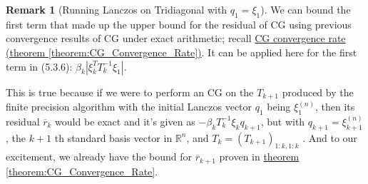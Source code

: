 \documentclass[]{article}
\theoremstyle{definition}
\newtheorem{remark}{Remark}[subsection]  %
\begin{document}
            \begin{remark}[Running Lanczos on Tridiagonal with $q_1=\xi_1$]\label{remark:CG_Float_Remark}
                We can bound the first term that made up the upper bound for the residual of CG using previous convergence results of CG under exact arithmetic; recall \hyperref[theorem:CG_Convergence_Rate]{CG convergence rate (theorem \ref*{theorem:CG_Convergence_Rate})}. It can be applied here for the first term in (5.3.6): 
                $\beta_k |
                \xi_k^T T_k^{-1}\xi_1|$. 
                \par
                This is true because if we were to perform an CG on the $T_{k + 1}$ produced by the finite precision algorithm with the initial Lanczos vector $q_1$ being $\xi_1^{(n)}$, then its residual $\overline{r}_{k}$ would be exact and it's given as $-\beta_kT_{k}^{-1}\xi_kq_{k + 1}$, but with $q_{k + 1} = \xi_{k + 1}^{(n)}$, the $k + 1$ th standard basis vector in $\mathbb R^{n}$, and $T_k = (T_{k + 1})_{1:k, 1:k}$ . And to our excitement, we already have the bound for $\overline{r}_{k+1}$ proven in \hyperref[theorem:CG_Convergence_Rate]{theorem \ref*{theorem:CG_Convergence_Rate}}.
            \end{remark}
\end{document}
